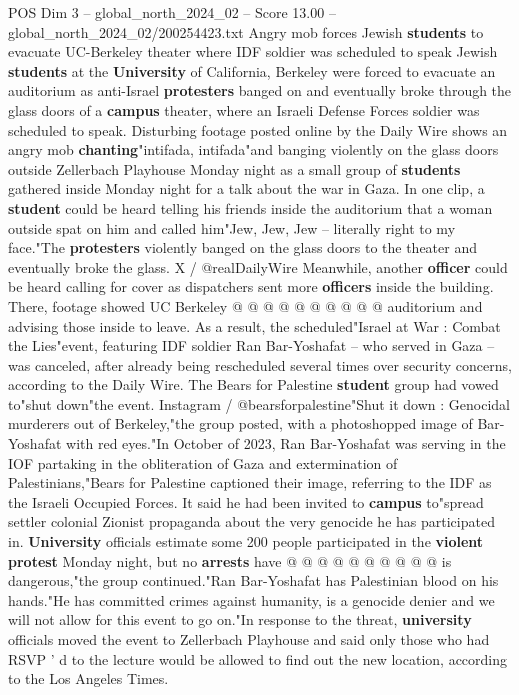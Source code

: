 \begin{textsample}{POS Dim 3 – global\_north\_2024\_02 – Score 13.00 – global\_north\_2024\_02/200254423.txt}  \label{ex:f3_pos_249}
Angry mob forces Jewish \textbf{students} to evacuate UC-Berkeley theater where IDF soldier was scheduled to speak Jewish \textbf{students} at the \textbf{University} of California, Berkeley were forced to evacuate an auditorium as anti-Israel \textbf{protesters} banged on and eventually broke through the glass doors of a \textbf{campus} theater, where an Israeli Defense Forces soldier was scheduled to speak.
Disturbing footage posted online by the Daily Wire shows an angry mob \textbf{chanting}"intifada, intifada"and banging violently on the glass doors outside Zellerbach Playhouse Monday night as a small group of \textbf{students} gathered inside Monday night for a talk about the war in Gaza.
In one clip, a \textbf{student} could be heard telling his friends inside the auditorium that a woman outside spat on him and called him"Jew, Jew, Jew -- literally right to my face."The \textbf{protesters} violently banged on the glass doors to the theater and eventually broke the glass.
X / @realDailyWire Meanwhile, another \textbf{officer} could be heard calling for cover as dispatchers sent more \textbf{officers} inside the building.
There, footage showed UC Berkeley @ @ @ @ @ @ @ @ @ @ auditorium and advising those inside to leave.
As a result, the scheduled"Israel at War : Combat the Lies"event, featuring IDF soldier Ran Bar-Yoshafat -- who served in Gaza -- was canceled, after already being rescheduled several times over security concerns, according to the Daily Wire.
The Bears for Palestine \textbf{student} group had vowed to"shut down"the event.
Instagram / @bearsforpalestine"Shut it down : Genocidal murderers out of Berkeley,"the group posted, with a photoshopped image of Bar-Yoshafat with red eyes."In October of 2023, Ran Bar-Yoshafat was serving in the IOF partaking in the obliteration of Gaza and extermination of Palestinians,"Bears for Palestine captioned their image, referring to the IDF as the Israeli Occupied Forces.
It said he had been invited to \textbf{campus} to"spread settler colonial Zionist propaganda about the very genocide he has participated in. \textbf{University} officials estimate some 200 people participated in the \textbf{violent} \textbf{protest} Monday night, but no \textbf{arrests} have @ @ @ @ @ @ @ @ @ @ is dangerous,"the group continued."Ran Bar-Yoshafat has Palestinian blood on his hands."He has committed crimes against humanity, is a genocide denier and we will not allow for this event to go on."In response to the threat, \textbf{university} officials moved the event to Zellerbach Playhouse and said only those who had RSVP ' d to the lecture would be allowed to find out the new location, according to the Los Angeles Times.

\end{textsample}
